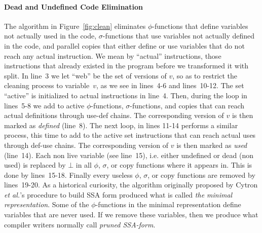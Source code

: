 \paragraph{Dead and Undefined Code Elimination}

The algorithm in Figure~\ref{fig:clean} eliminates $\phi$-functions that define variables not actually used in the code, $\sigma$-functions that use variables not actually defined in the code, and parallel copies that either define or use variables that do not reach any actual instruction.
We mean by ``actual'' instructions, those instructions that already existed in the program before we transformed it with {\sf split}.
In line~3 we let ``web'' be the set of versions of $v$, so as to restrict the cleaning process to variable~$v$, as we see in lines~4-6 and lines~10-12.
The set ``active'' is initialized to actual instructions in line~4.
Then, during the loop in lines~5-8 we add to active $\phi$-functions, $\sigma$-functions, and copies that can reach actual definitions through use-def chains.
The corresponding version of $v$ is then marked as \emph{defined} (line~8).
The next loop, in lines 11-14 performs a similar process, this time to add to the active set instructions that can reach actual uses through def-use chains.
The corresponding version of $v$ is then marked as \emph{used} (line~14).
Each non live variable (see line~15), i.e. either undefined or dead (non used) is replaced by $\bot$ in all $\phi$, $\sigma$, or copy functions where it appears in.
This is done by lines~15-18.
Finally every useless $\phi$, $\sigma$, or copy functions are removed by lines~19-20. 
As a historical curiosity, the algorithm originally proposed by Cytron {\em et al.}'s procedure to build SSA form produced what is called {\em the minimal representation}.
Some of the $\phi$-functions in the minimal representation define variables
that are never used.
If we remove these variables, then we produce what compiler writers normally call {\em pruned SSA-form}.

